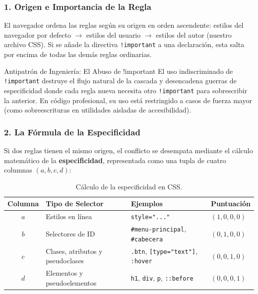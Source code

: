 \subsubsection{1. Origen e Importancia de la Regla}
El navegador ordena las reglas según su origen en orden ascendente: estilos del navegador por defecto $\rightarrow$ estilos del usuario $\rightarrow$ estilos del autor (nuestro archivo CSS). Si se añade la directiva \texttt{!important} a una declaración, esta salta por encima de todas las demás reglas ordinarias.
\begin{importante}{Antipatrón de Ingeniería: El Abuso de !important}
El uso indiscriminado de \texttt{!important} destruye el flujo natural de la cascada y desencadena guerras de especificidad donde cada regla nueva necesita otro \texttt{!important} para sobrescribir la anterior. En código profesional, su uso está restringido a casos de fuerza mayor (como sobreescrituras en utilidades aisladas de accesibilidad).
\end{importante}

\subsubsection{2. La Fórmula de la Especificidad}
Si dos reglas tienen el mismo origen, el conflicto se desempata mediante el cálculo matemático de la \textbf{especificidad}, representada como una tupla de cuatro columnas $(a, b, c, d)$:

\begin{table}[htbp]
\centering
\caption{Cálculo de la especificidad en CSS.}
\label{tab:especificidad-css}
\begin{tabularx}{\textwidth}{c l X l}
\toprule
\textbf{Columna} & \textbf{Tipo de Selector} & \textbf{Ejemplos} & \textbf{Puntuación} \\
\midrule
$a$ & Estilos en línea & \texttt{style="..."} & $(1, 0, 0, 0)$ \\
$b$ & Selectores de ID & \texttt{\#menu-principal}, \texttt{\#cabecera} & $(0, 1, 0, 0)$ \\
$c$ & Clases, atributos y pseudoclases & \texttt{.btn}, \texttt{[type="text"]}, \texttt{:hover} & $(0, 0, 1, 0)$ \\
$d$ & Elementos y pseudoelementos & \texttt{h1}, \texttt{div}, \texttt{p}, \texttt{::before} & $(0, 0, 0, 1)$ \\
\bottomrule
\end{tabularx}
\end{table}

